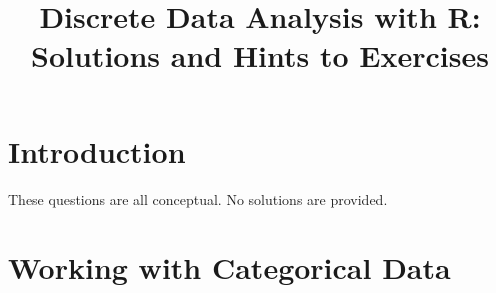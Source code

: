 \documentclass[11pt]{report}\usepackage[]{graphicx}\usepackage[]{color}
\title{\sffamily Discrete Data Analysis with R: \\ Solutions and Hints to Exercises}
\begin{document}
\maketitle



\chapter{Introduction}\label{ch:intro}
These questions are all conceptual.  No solutions are provided.




\chapter{Working with Categorical Data}\label{ch:working}
\end{document}
